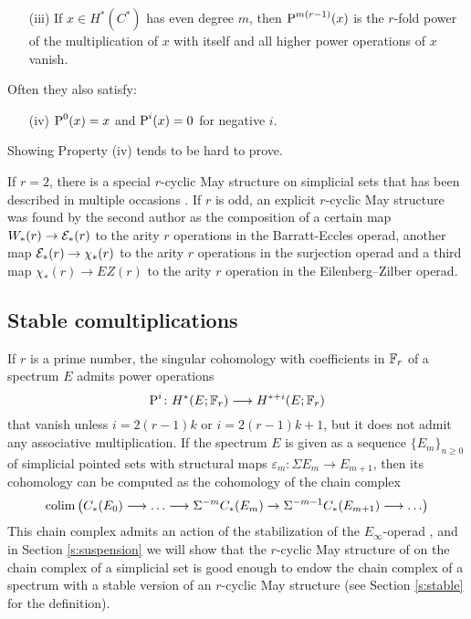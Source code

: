 \begin{itemize}
	\item[(iii)] If $x\in H^*(C^*)$  has even degree $m$, then $\operatorname{P}^{m(r-1)}(x)$ is the $r$-fold power of the multiplication of $x$ with itself and all higher power operations of $x$ vanish.
\end{itemize}
Often they also satisfy:
\begin{enumerate}
	\item[(iv)] $\operatorname{P}^0(x) = x$ and $\operatorname{P}^i(x) = 0$ for negative $i$.
\end{enumerate}
Showing Property (iv) tends to be hard to prove.

If $r=2$, there is a special $r$-cyclic May structure on simplicial sets that has been described in multiple occasions \cite{steenrod1947products,gonzalez-diaz1999steenrod,medina2021fast_sq}. If $r$ is odd, an explicit $r$-cyclic May structure was found by the second author \cite{medina2021may_st} as the composition of a certain map $W_*(r)\to \mathcal{E}_*(r)$ to the arity $r$ operations in the Barratt-Eccles operad, another map $\mathcal{E}_*(r)\to \chi_*(r)$ to the arity $r$ operations in the surjection operad \cite{berger2004combinatorial} and a third map $\chi_*(r)\to EZ(r)$ to the arity $r$ operation in the Eilenberg--Zilber operad\cite{mcclure2003multivariable}.

\subsection{Stable comultiplications} If $r$ is a prime number, the singular cohomology with coefficients in $\mathbb{F}_r$ of a spectrum $E$ admits power operations
\[
\operatorname{P}^i\colon H^*(E;\mathbb{F}_r)\longrightarrow H^{*+i}(E;\mathbb{F}_r)
\]
that vanish unless $i = 2(r-1)k$ or $i = 2(r-1)k+1$, but it does not admit any associative multiplication. If the spectrum $E$ is given as a sequence $\{E_m\}_{n\geq 0}$ of simplicial pointed sets with structural maps $\varepsilon_m\colon \Sigma E_m\to E_{m+1}$, then its cohomology can be computed as the cohomology of the chain complex
\[
\operatorname*{colim} \left(C_{*}(E_0)\longrightarrow \ldots \longrightarrow \Sigma^{-m}C_{*}(E_m)\to \Sigma^{-m-1} C_{*}(E_{m+1})\longrightarrow\ldots\right)
\]
This chain complex admits an action of the stabilization of the $E_{\infty}$-operad \cite{Gill2020}, and in Section \ref{s:suspension} we will show that the $r$-cyclic May structure of \cite{medina2021may_st} on the chain complex of a simplicial set is good enough to endow the chain complex of a spectrum with a stable version of an $r$-cyclic May structure (see Section \ref{s:stable} for the definition).

